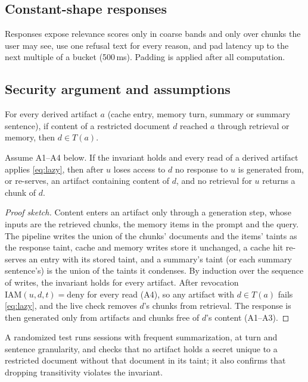 \subsection{Constant-shape responses}
Responses expose relevance scores only in coarse bands and only over chunks the user may see, use one
refusal text for every reason, and pad latency up to the next multiple of a bucket (500\,ms). Padding
is applied after all computation.

\subsection{Security argument and assumptions}
\label{sec:soundness}
\begin{invariant}
For every derived artifact $a$ (cache entry, memory turn, summary or summary sentence), if content
of a restricted document $d$ reached $a$ through retrieval or memory, then $d\in T(a)$.
\end{invariant}

\begin{proposition}
Assume A1--A4 below. If the invariant holds and every read of a derived artifact applies
\eqref{eq:lazy}, then after $u$ loses access to $d$ no response to $u$ is generated from, or
re-serves, an artifact containing content of $d$, and no retrieval for $u$ returns a chunk of $d$.
\end{proposition}
\begin{proof}[Proof sketch]
Content enters an artifact only through a generation step, whose inputs are the retrieved chunks,
the memory items in the prompt and the query. The pipeline writes the union of the chunks' documents
and the items' taints as the response taint, cache and memory writes store it unchanged, a cache hit
re-serves an entry with its stored taint, and a summary's taint (or each summary sentence's) is the
union of the taints it condenses. By induction over the sequence of writes, the invariant holds for
every artifact. After revocation $\mathrm{IAM}(u,d,t)=\text{deny}$ for every read (A4), so any
artifact with $d\in T(a)$ fails \eqref{eq:lazy}, and the live check removes $d$'s chunks from
retrieval. The response is then generated only from artifacts and chunks free of $d$'s content (A1--A3).
\end{proof}

A randomized test runs sessions with frequent summarization, at turn and sentence granularity, and
checks that no artifact holds a secret unique to a restricted document without that document in its
taint; it also confirms that dropping transitivity violates the invariant.


